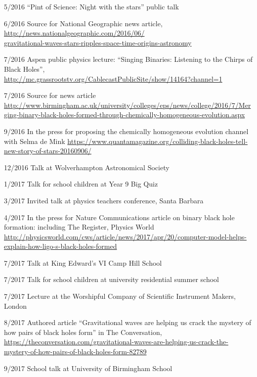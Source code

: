 \documentclass[margin,line]{res}
\begin{document}
\begin{resume}
5/2016	``Pint of Science: Night with the stars'' public talk

6/2016	Source for National Geographic news article,\\ \url{http://news.nationalgeographic.com/2016/06/}\\\url{gravitational-waves-stars-ripples-space-time-origins-astronomy}

7/2016	Aspen public physics lecture: ``Singing Binaries: Listening to the Chirps of Black Holes'',\\\url{http://mc.grassrootstv.org/CablecastPublicSite/show/14164?channel=1}

7/2016 	Source for news article\\ \url{http://www.birmingham.ac.uk/university/colleges/eps/news/college/2016/7/Merging-binary-black-holes-formed-through-chemically-homogeneous-evolution.aspx}

9/2016 	In the press for proposing the chemically homogeneous evolution channel with Selma de Mink \url{https://www.quantamagazine.org/colliding-black-holes-tell-new-story-of-stars-20160906/}

12/2016	Talk at Wolverhampton Astronomical Society

1/2017	Talk for school children at Year 9 Big Quiz

3/2017	Invited talk at physics teachers conference, Santa Barbara

4/2017	In the press for Nature Communications article on binary black hole formation: including The Register, %
Physics World\\ \url{http://physicsworld.com/cws/article/news/2017/apr/20/computer-model-helps-explain-how-ligo-s-black-holes-formed}

7/2017	Talk at King Edward's VI Camp Hill School

7/2017	Talk for school children at university residential summer school

7/2017 	Lecture at the Worshipful Company of Scientific Instrument Makers, London

8/2017	Authored article ``Gravitational waves are helping us crack the mystery of how pairs of black holes form'' in The Conversation,\\ 
\url{https://theconversation.com/gravitational-waves-are-helping-us-crack-the-mystery-of-how-pairs-of-black-holes-form-82789}

9/2017	School talk at University of Birmingham School


\end{resume}
\end{document}
